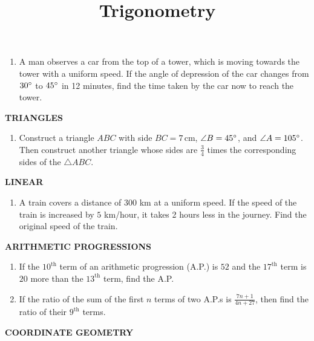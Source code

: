 \documentclass{article}
\title{Trigonometry}
\date{}
\begin{document}
\maketitle

\begin{enumerate}
    \item A man observes a car from the top of a tower, which is moving towards the tower with a uniform speed. If the angle of depression of the car changes from $30\degree$ to $45\degree$ in 12 minutes, find the time taken by the car now to reach the tower.
\end{enumerate}

\begin{center}
\textbf{TRIANGLES}
\end{center}

\begin{enumerate}
    \item Construct a triangle $ABC$ with side $BC = 7\, \text{cm}$, $\angle B = 45\degree$, and $\angle A = 105\degree$. Then construct another triangle whose sides are $\frac{3}{4}$ times the corresponding sides of the $\triangle ABC$.
\end{enumerate}

\begin{center}
\textbf{LINEAR}
\end{center}

\begin{enumerate}
    \item A train covers a distance of $300$ km at a uniform speed. If the speed of the train is increased by $5$ km/hour, it takes 2 hours less in the journey. Find the original speed of the train.
\end{enumerate}

\begin{center}
\textbf{ARITHMETIC PROGRESSIONS}
\end{center}

\begin{enumerate}
    \item If the $10^\text{th}$ term of an arithmetic progression (A.P.) is $52$ and the $17^\text{th}$ term is $20$ more than the $13^\text{th}$ term, find the A.P.
    \item If the ratio of the sum of the first $n$ terms of two A.P.s is $\frac{7n + 1}{4n + 27}$, then find the ratio of their $9^\text{th}$ terms.
\end{enumerate}

\begin{center}
\textbf{COORDINATE GEOMETRY}
\end{center}
\end{document}
